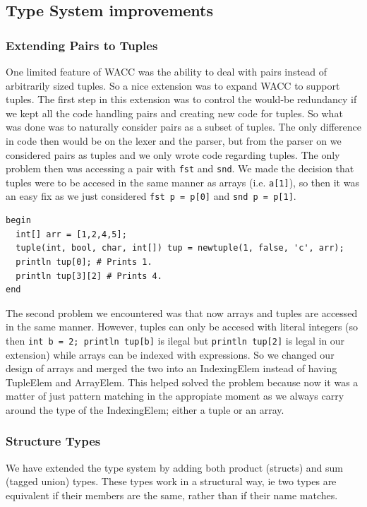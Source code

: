 \documentclass{article}
\begin{document}
\subsection{Type System improvements}
\subsubsection{Extending Pairs to Tuples}
One limited feature of WACC was the ability to deal with pairs instead of arbitrarily sized tuples. So a nice extension was to expand WACC to support tuples. The first step in this extension was to control the would-be redundancy if we kept all the code handling pairs and creating new code for tuples. So what was done was to naturally consider pairs as a subset of tuples. The only difference in code then would be on the lexer and the parser, but from the parser on we considered pairs as tuples and we only wrote code regarding tuples. The only problem then was accessing a pair with \texttt{fst} and \texttt{snd}. We made the decision that tuples were to be accesed in the same manner as arrays (i.e. \texttt{a[1]}), so then it  was an easy fix as we just considered \texttt{fst p = p[0]} and \texttt{snd p = p[1]}.

\begin{lstlisting}
begin
  int[] arr = [1,2,4,5];
  tuple(int, bool, char, int[]) tup = newtuple(1, false, 'c', arr);
  println tup[0]; # Prints 1.
  println tup[3][2] # Prints 4.
end
\end{lstlisting}
The second problem we encountered was that now arrays and tuples are accessed in the same manner. However, tuples can only be accesed with literal integers (so
then \texttt{int b = 2; println tup[b]} is ilegal but \texttt{println tup[2]} is legal in our extension) while arrays can be indexed with expressions. So we changed our design of arrays and merged the two into an IndexingElem instead of having TupleElem and ArrayElem. This helped solved the problem because now it was a matter of just pattern matching in the appropiate moment as we always carry around the type of the IndexingElem; either a tuple or an array.


\subsubsection{Structure Types}
We have extended the type system by adding both product (structs) and sum (tagged union) types.
These types work in a structural way, ie two types are equivalent if their members are the same,
rather than if their name matches.
\end{document}
